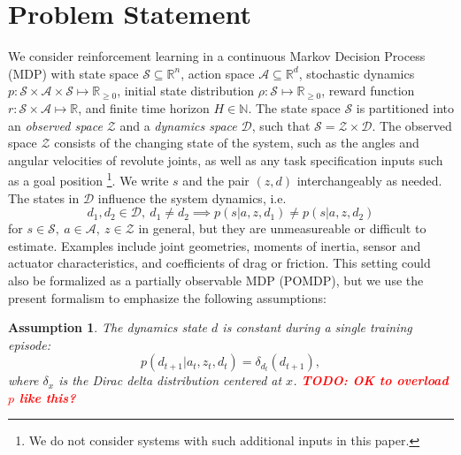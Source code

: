 \documentclass{article}
\newcommand{\R}{\mathbb{R}}
\newcommand{\TODO}[1]{\textcolor{red}{\textbf{TODO: #1}}}
\newcommand{\cA}{\mathcal{A}}
\newcommand{\cS}{\mathcal{S}}
\newcommand{\sysid}{dynamics}
\newcommand{\obset}{\mathcal{Z}}
\newcommand{\idset}{\mathcal{D}}
\newcommand{\obvar}{z}
\newcommand{\idvar}{d}
\newtheorem{assumption}[theorem]{Assumption}
\begin{document}
\section{Problem Statement}

We consider reinforcement learning in a continuous Markov Decision Process (MDP)
with state space $\cS \subseteq \R^n$,
action space $\cA \subseteq \R^d$,
stochastic dynamics $p : \cS \times \cA \times \cS \mapsto \R_{\geq 0}$,
initial state distribution $\rho : \cS \mapsto \R_{\geq 0}$,
reward function $r : \cS \times \cA \mapsto \R$,
and finite time horizon $H \in \mathbb{N}$.
%
The state space $\cS$ is partitioned into
an \emph{observed space} $\obset$
and a \emph{\sysid{} space} $\idset$,
such that $\cS = \obset \times \idset$.
The observed space $\obset$ consists of the changing state of the system, such as the angles and angular velocities of revolute joints,
as well as any task specification inputs such as a goal position%
\footnote{We do not consider systems with such additional inputs in this paper.}.
We write $s$ and the pair $(\obvar, \idvar)$ interchangeably as needed.
The states in $\idset$ influence the system dynamics, i.e.
\begin{equation}
\idvar_1, \idvar_2 \in \idset,\ \idvar_1 \neq \idvar_2 \implies p(s|a,\obvar,\idvar_1) \neq p(s|a,\obvar,\idvar_2)
\end{equation}
for $s \in \cS,\ a \in \cA,\ \obvar \in \obset$ in general,
but they are unmeasureable or difficult to estimate.
Examples include joint geometries, moments of inertia, sensor and actuator characteristics, and coefficients of drag or friction.
This setting could also be formalized as a partially observable MDP (POMDP),
but we use the present formalism to emphasize the following assumptions:
\begin{assumption}
The dynamics state $d$ is constant during a single training episode:
$$p(\idvar_{t+1}|a_t, \obvar_t, \idvar_t) = \delta_{\idvar_t}(\idvar_{t+1}),$$
where $\delta_x$ is the Dirac delta distribution centered at $x$. \TODO{OK to overload $p$ like this?}
\end{assumption}
\end{document}
